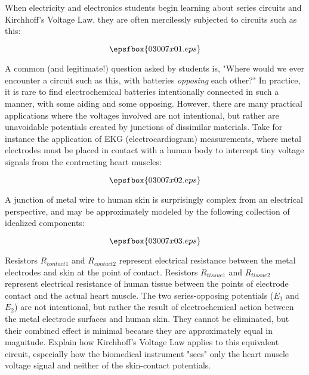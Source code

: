 

When electricity and electronics students begin learning about series circuits and Kirchhoff's Voltage Law, they are often mercilessly subjected to circuits such as this:

$$\epsfbox{03007x01.eps}$$

A common (and legitimate!) question asked by students is, "Where would we ever encounter a circuit such as this, with batteries {\it opposing} each other?"  In practice, it is rare to find electrochemical batteries intentionally connected in such a manner, with some aiding and some opposing.  However, there are many practical applications where the voltages involved are not intentional, but rather are unavoidable potentials created by junctions of dissimilar materials.  Take for instance the application of EKG (electrocardiogram) measurements, where metal electrodes must be placed in contact with a human body to intercept tiny voltage signals from the contracting heart muscles:

$$\epsfbox{03007x02.eps}$$

A junction of metal wire to human skin is surprisingly complex from an electrical perspective, and may be approximately modeled by the following collection of idealized components:

$$\epsfbox{03007x03.eps}$$

Resistors $R_{contact1}$ and $R_{contact2}$ represent electrical resistance between the metal electrodes and skin at the point of contact.  Resistors $R_{tissue1}$ and $R_{tissue2}$ represent electrical resistance of human tissue between the points of electrode contact and the actual heart muscle.  The two series-opposing potentials ($E_1$ and $E_2$) are not intentional, but rather the result of electrochemical action between the metal electrode surfaces and human skin.  They cannot be eliminated, but their combined effect is minimal because they are approximately equal in magnitude.  Explain how Kirchhoff's Voltage Law applies to this equivalent circuit, especially how the biomedical instrument "sees" only the heart muscle voltage signal and neither of the skin-contact potentials.






